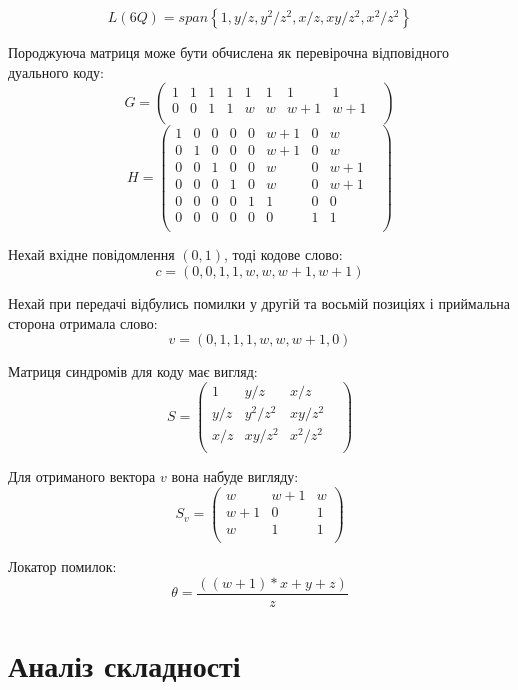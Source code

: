 \documentclass[a4paper,12pt,oneside]{article}
\begin{document}
$$L(6Q) = span \left \{ 1, y/z, y^2/z^2, x/z, xy/z^2, x^2/z^2 \right \}$$

Породжуюча матриця може бути обчислена як перевірочна відповідного дуального коду:
$$
G = 
\begin{pmatrix}
    1 &  1 &  1 &  1 &  1 &  1 &  1 &  1 &  \\
    0 &  0 &  1 &  1 &  w &  w &  w + 1 &  w + 1 &  \\
\end{pmatrix}
$$
$$
H = 
\begin{pmatrix}
    1 &  0 &  0 &  0 &  0 &  w + 1 &  0 &  w &  \\
    0 &  1 &  0 &  0 &  0 &  w + 1 &  0 &  w &  \\
    0 &  0 &  1 &  0 &  0 &  w &  0 &  w + 1 &  \\
    0 &  0 &  0 &  1 &  0 &  w &  0 &  w + 1 &  \\
    0 &  0 &  0 &  0 &  1 &  1 &  0 &  0 &  \\
    0 &  0 &  0 &  0 &  0 &  0 &  1 &  1 &  \\
\end{pmatrix}
$$

Нехай вхідне повідомлення $(0,1)$, тоді кодове слово:
$$c=(0, 0, 1, 1, w, w, w + 1, w + 1)$$

Нехай при передачі відбулись помилки у другій та восьмій позиціях і приймальна сторона отримала слово:
$$v=(0, 1, 1, 1, w, w, w + 1, 0)$$

Матриця синдромів для коду має вигляд:
$$
S =
\begin{pmatrix}
    1 &  y/z &  x/z &  \\
    y/z &  y^2/z^2 &  xy/z^2 &  \\
    x/z &  xy/z^2 &  x^2/z^2 &  \\
\end{pmatrix}
$$

Для отриманого вектора $v$ вона набуде вигляду:
$$
S_v =
\begin{pmatrix}
    w & w +1 & w \\
    w + 1 & 0 & 1 \\
    w & 1 & 1 \\
\end{pmatrix}
$$

Локатор помилок:
$$
\theta = \frac{(( w + 1)*x + y + z)}{z}
$$

\section{Аналіз складності}
\end{document}
